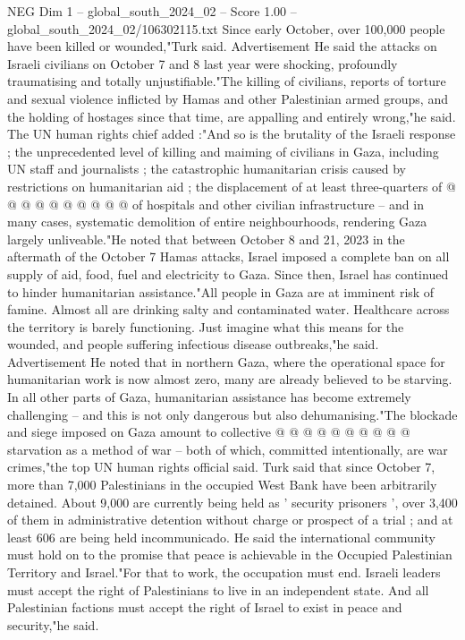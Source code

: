 \begin{textsample}{NEG Dim 1 – global\_south\_2024\_02 – Score 1.00 – global\_south\_2024\_02/106302115.txt}
Since early October, over 100,000 people have been killed or wounded,"Turk said.
Advertisement He said the attacks on Israeli civilians on October 7 and 8 last year were shocking, profoundly traumatising and totally unjustifiable."The killing of civilians, reports of torture and sexual violence inflicted by Hamas and other Palestinian armed groups, and the holding of hostages since that time, are appalling and entirely wrong,"he said.
The UN human rights chief added :"And so is the brutality of the Israeli response ; the unprecedented level of killing and maiming of civilians in Gaza, including UN staff and journalists ; the catastrophic humanitarian crisis caused by restrictions on humanitarian aid ; the displacement of at least three-quarters of @ @ @ @ @ @ @ @ @ @ of hospitals and other civilian infrastructure -- and in many cases, systematic demolition of entire neighbourhoods, rendering Gaza largely unliveable."He noted that between October 8 and 21, 2023 in the aftermath of the October 7 Hamas attacks, Israel imposed a complete ban on all supply of aid, food, fuel and electricity to Gaza.
Since then, Israel has continued to hinder humanitarian assistance."All people in Gaza are at imminent risk of famine.
Almost all are drinking salty and contaminated water.
Healthcare across the territory is barely functioning.
Just imagine what this means for the wounded, and people suffering infectious disease outbreaks,"he said.
Advertisement He noted that in northern Gaza, where the operational space for humanitarian work is now almost zero, many are already believed to be starving.
In all other parts of Gaza, humanitarian assistance has become extremely challenging -- and this is not only dangerous but also dehumanising."The blockade and siege imposed on Gaza amount to collective @ @ @ @ @ @ @ @ @ @ starvation as a method of war -- both of which, committed intentionally, are war crimes,"the top UN human rights official said.
Turk said that since October 7, more than 7,000 Palestinians in the occupied West Bank have been arbitrarily detained.
About 9,000 are currently being held as ' security prisoners ', over 3,400 of them in administrative detention without charge or prospect of a trial ; and at least 606 are being held incommunicado.
He said the international community must hold on to the promise that peace is achievable in the Occupied Palestinian Territory and Israel."For that to work, the occupation must end.
Israeli leaders must accept the right of Palestinians to live in an independent state.
And all Palestinian factions must accept the right of Israel to exist in peace and security,"he said.

\end{textsample}
